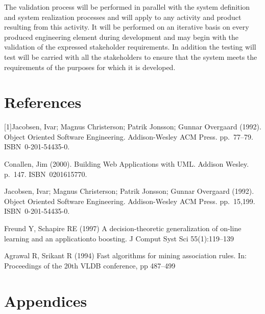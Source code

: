 \documentclass[a4paper,12pt]{article}
\begin{document}
\par
The validation process will be performed in parallel with the system definition and system realization processes and  will apply to any activity and product resulting from this activity. It will be performed on an iterative basis on every produced engineering element during development and may begin with the validation of the expressed stakeholder requirements. In addition the testing will test will be carried with all the stakeholders to ensure that the system meets the requirements of the purposes for which it is developed. 

\newpage
\section{References}

[1]Jacobsen, Ivar; Magnus Christerson; Patrik Jonsson; Gunnar Overgaard (1992). Object Oriented Software Engineering. Addison-Wesley ACM Press. pp. 77–79. ISBN 0-201-54435-0.
\par
[2]Conallen, Jim (2000). Building Web Applications with UML. Addison Wesley. p. 147. ISBN 0201615770.
\par
[3]Jacobsen, Ivar; Magnus Christerson; Patrik Jonsson; Gunnar Overgaard (1992). Object Oriented Software Engineering. Addison-Wesley ACM Press. pp. 15,199. ISBN 0-201-54435-0.
\par
[4] Freund Y, Schapire RE (1997) A decision-theoretic generalization of on-line learning and an applicationto boosting. J Comput Syst Sci 55(1):119–139
\par
[5]Agrawal R, Srikant R (1994) Fast algorithms for mining association rules. In: Proceedings of the 20th  VLDB conference, pp 487–499

\newpage
\section{Appendices}
\end{document}
